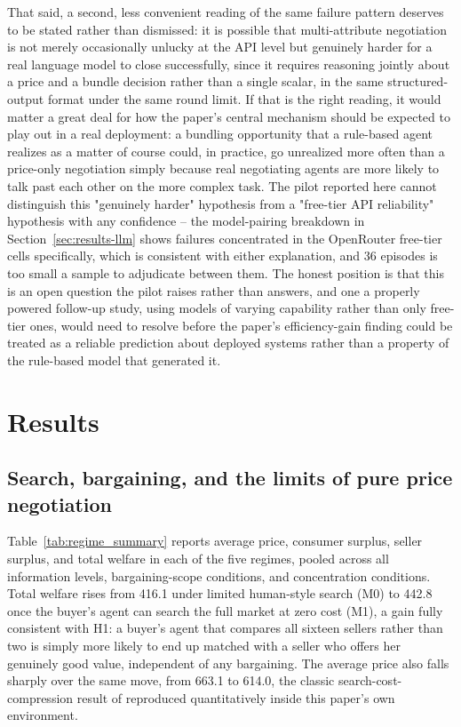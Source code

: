 \documentclass[review]{elsarticle}
\begin{document}
That said, a second, less convenient reading of the same failure pattern deserves to be stated rather than dismissed: it is possible that multi-attribute negotiation is not merely occasionally unlucky at the API level but genuinely harder for a real language model to close successfully, since it requires reasoning jointly about a price and a bundle decision rather than a single scalar, in the same structured-output format under the same round limit. If that is the right reading, it would matter a great deal for how the paper's central mechanism should be expected to play out in a real deployment: a bundling opportunity that a rule-based agent realizes as a matter of course could, in practice, go unrealized more often than a price-only negotiation simply because real negotiating agents are more likely to talk past each other on the more complex task. The pilot reported here cannot distinguish this "genuinely harder" hypothesis from a "free-tier API reliability" hypothesis with any confidence -- the model-pairing breakdown in Section~\ref{sec:results-llm} shows failures concentrated in the OpenRouter free-tier cells specifically, which is consistent with either explanation, and 36 episodes is too small a sample to adjudicate between them. The honest position is that this is an open question the pilot raises rather than answers, and one a properly powered follow-up study, using models of varying capability rather than only free-tier ones, would need to resolve before the paper's efficiency-gain finding could be treated as a reliable prediction about deployed systems rather than a property of the rule-based model that generated it.

\section{Results}
\label{sec:results}

\subsection{Search, bargaining, and the limits of pure price negotiation}
\label{sec:results-search}

Table~\ref{tab:regime_summary} reports average price, consumer surplus, seller surplus, and total welfare in each of the five regimes, pooled across all information levels, bargaining-scope conditions, and concentration conditions. Total welfare rises from 416.1 under limited human-style search (M0) to 442.8 once the buyer's agent can search the full market at zero cost (M1), a gain fully consistent with H1: a buyer's agent that compares all sixteen sellers rather than two is simply more likely to end up matched with a seller who offers her genuinely good value, independent of any bargaining. The average price also falls sharply over the same move, from 663.1 to 614.0, the classic search-cost-compression result of \citet{bakos1997reducing} reproduced quantitatively inside this paper's own environment.
\end{document}
